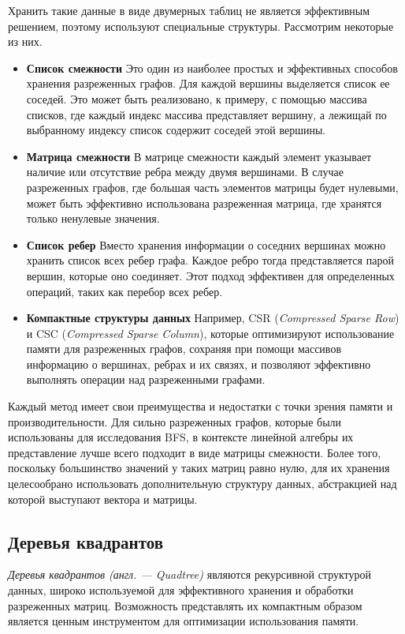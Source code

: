 Хранить такие данные в виде двумерных таблиц не является эффективным решением, поэтому используют специальные структуры. Рассмотрим некоторые из них.

\begin{itemize}
	\item{\textbf{Список смежности}} \newline
	Это один из наиболее простых и эффективных способов хранения разреженных графов. Для каждой вершины выделяется список ее соседей. Это может быть реализовано, к примеру, с помощью массива списков, где каждый индекс массива представляет вершину, а лежищай по выбранному индексу список содержит соседей этой вершины.
    \item{\textbf{Матрица смежности}} \newline 
    В матрице смежности каждый элемент указывает наличие или отсутствие ребра между двумя вершинами. В случае разреженных графов, где большая часть элементов матрицы будет нулевыми, может быть эффективно использована разреженная матрица, где хранятся только ненулевые значения.
    \item{\textbf{Список ребер}} \newline 
    Вместо хранения информации о соседних вершинах можно хранить список всех ребер графа. Каждое ребро тогда представляется парой вершин, которые оно соединяет. Этот подход эффективен для определенных операций, таких как перебор всех ребер.
    \item{\textbf{Компактные структуры данных}} \newline
    Например, CSR (\textit{Compressed Sparse Row}) и CSC (\textit{Compressed Sparse Column}), которые оптимизируют использование памяти для разреженных графов, сохраняя при помощи массивов информацию о вершинах, ребрах и их связях, и позволяют эффективно выполнять операции над разреженными графами.
\end{itemize}

\noindent Каждый метод имеет свои преимущества и недостатки с точки зрения памяти и производительности. Для сильно разреженных графов, которые были использованы для исследования BFS, в контексте линейной алгебры их представление лучше всего подходит в виде матрицы смежности. Более того, поскольку большинство значений у таких матриц равно нулю, для их хранения целесообрано использовать дополнительную структуру данных, абстракцией над которой выступают вектора и матрицы.



\subsection{Деревья квадрантов}
\noindent \textit{Деревья квадрантов (англ. --- Quadtree)} являются рекурсивной структурой данных, широко используемой для эффективного хранения и обработки разреженных матриц. Возможность представлять их компактным образом является ценным инструментом для оптимизации использования памяти.

